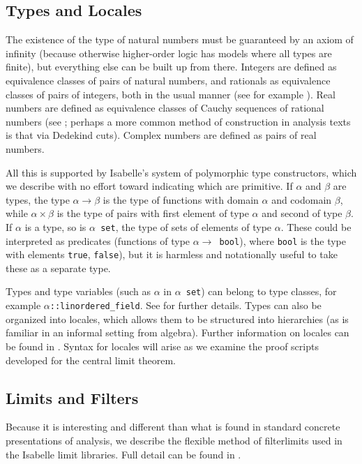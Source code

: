 \documentclass{article}
\theoremstyle{definition}
\begin{document}
\subsection{Types and Locales} \label{sec:loc}

The existence of the type of natural numbers must be guaranteed by an axiom of infinity (because otherwise higher-order logic has models where all types are finite), but everything else can be built up from there. Integers are defined as equivalence classes of pairs of natural numbers, and rationals as equivalence classes of pairs of integers, both in the usual manner (see for example \cite{enderton}). Real numbers are defined as equivalence classes of Cauchy sequences of rational numbers (see \cite{suppes}; perhaps a more common method of construction in analysis texts is that via Dedekind cuts). Complex numbers are defined as pairs of real numbers.

All this is supported by Isabelle's system of polymorphic type constructors, which we describe with no effort toward indicating which are primitive. If $\alpha$ and $\beta$ are types, the type $\alpha \rightarrow \beta$ is the type of functions with domain $\alpha$ and codomain $\beta$, while $\alpha \times \beta$ is the type of pairs with first element of type $\alpha$ and second of type $\beta$. If $\alpha$ is a type, so is \texttt{$\alpha$ set}, the type of sets of elements of type $\alpha$. These could be interpreted as predicates (functions of type \texttt{$\alpha \rightarrow$ bool}), where \texttt{bool} is the type with elements \texttt{true}, \texttt{false}), but it is harmless and notationally useful to take these as a separate type.

Types and type variables (such as $\alpha$ in \texttt{$\alpha$ set}) can belong to type classes, for example \texttt{$\alpha$::linordered\_field}. See \cite{haftmann} for further details. Types can also be organized into locales, which allows them to be structured into hierarchies (as is familiar in an informal setting from algebra). Further information on locales can be found in \cite{ballarin}. Syntax for locales will arise as we examine the proof scripts developed for the central limit theorem.

\subsection{Limits and Filters} \label{sec:filterlim}

Because it is interesting and different than what is found in standard concrete presentations of analysis, we describe the flexible method of filterlimits used in the Isabelle limit libraries. Full detail can be found in \cite{hoelzl-filter}.
\end{document}
